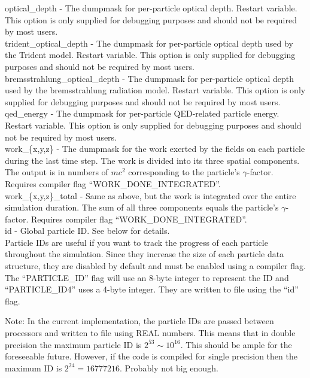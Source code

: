 {\emphtext optical\_depth} - The dumpmask for per-particle optical depth.
  Restart variable. This option is only supplied for debugging purposes and
  should not be required by most users.\\

{\emphtext trident\_optical\_depth} - The dumpmask for per-particle optical
  depth used by the Trident model.
  Restart variable. This option is only supplied for debugging purposes and
  should not be required by most users.\\

{\emphtext bremsstrahlung\_optical\_depth} - The dumpmask for per-particle
  optical depth used by the bremsstrahlung radiation model.
  Restart variable. This option is only supplied for debugging purposes and
  should not be required by most users.\\

{\emphtext qed\_energy} - The dumpmask for per-particle QED-related particle
  energy.
  Restart variable. This option is only supplied for debugging purposes and
  should not be required by most users.\\

{\emphtext work\_\{x,y,z\}} - The dumpmask for the work exerted by the
  fields on each particle during the last time step. The work is divided into
  its three spatial components. The output is in numbers of $mc^2$ corresponding
  to the particle's $\gamma$-factor. Requires compiler flag
  ``WORK\_DONE\_INTEGRATED''.\\

{\emphtext work\_\{x,y,z\}\_total} - Same as above,
  but the work is integrated over the entire simulation duration. The sum of all
  three components equals the particle's $\gamma$-factor. Requires compiler
  flag ``WORK\_DONE\_INTEGRATED''.\\

{\emphtext id} - Global particle ID. See below for details.\\

Particle IDs are useful if you want to track the progress
of each particle throughout the simulation. Since they increase
the size of each particle data structure, they are disabled by
default and must be enabled using a compiler flag.
The ``PARTICLE\_ID'' flag will use an 8-byte integer to represent the
ID and ``PARTICLE\_ID4'' uses a 4-byte integer.
They are written to file using the ``id'' flag.

Note: In the current implementation, the particle IDs are
passed between processors and written to file using REAL numbers.
This means that in double precision the maximum particle ID
is $2^{53} \sim 10^{16}$. This should be ample for the foreseeable future.
However, if the code is compiled for single precision then the
maximum ID is $2^{24} = 16777216$. Probably not big enough.

